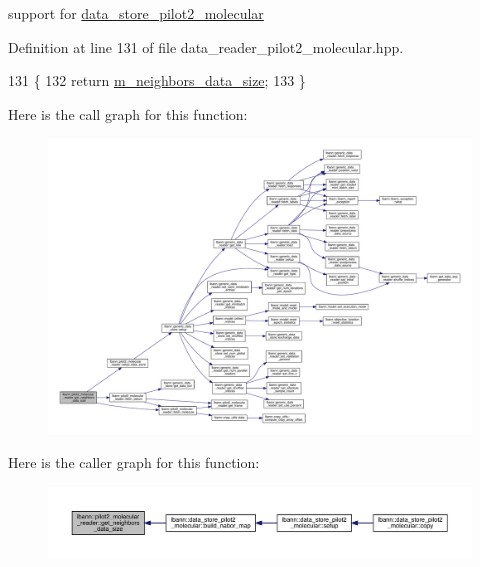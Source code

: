 support for \hyperlink{classlbann_1_1data__store__pilot2__molecular}{data\+\_\+store\+\_\+pilot2\+\_\+molecular} 



Definition at line 131 of file data\+\_\+reader\+\_\+pilot2\+\_\+molecular.\+hpp.


\begin{DoxyCode}
131                                 \{
132     \textcolor{keywordflow}{return} \hyperlink{classlbann_1_1pilot2__molecular__reader_a0d61b0b65b1998694272a5d2173cbac7}{m\_neighbors\_data\_size};
133   \}
\end{DoxyCode}
Here is the call graph for this function\+:\nopagebreak
\begin{figure}[H]
\begin{center}
\leavevmode
\includegraphics[width=350pt]{classlbann_1_1pilot2__molecular__reader_a628d96b642e913550316076a11ba5285_cgraph}
\end{center}
\end{figure}
Here is the caller graph for this function\+:\nopagebreak
\begin{figure}[H]
\begin{center}
\leavevmode
\includegraphics[width=350pt]{classlbann_1_1pilot2__molecular__reader_a628d96b642e913550316076a11ba5285_icgraph}
\end{center}
\end{figure}
\mbox{\label{classlbann_1_1pilot2__molecular__reader_ad4fcb0da3f6964cbe24de4feac3f5f4a}} 
